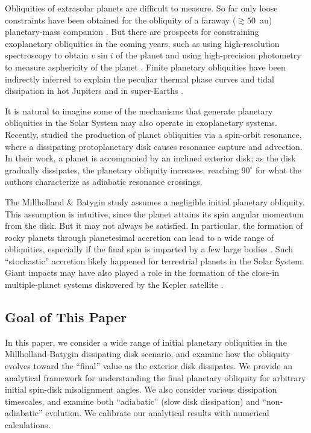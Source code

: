 \documentclass[twocolumn,twocolappendix]{aastex63}
\begin{document}
Obliquities of extrasolar planets are difficult to measure. So far only loose
constraints have been obtained for the obliquity of a faraway ($\gtrsim 50$~au)
planetary-mass companion \citep{bryan2020obliquity}. But there are prospects for
constraining exoplanetary obliquities in the coming years, such as using
high-resolution spectroscopy to obtain $v\sin i$ of the planet
\citep{snellen2014fast, bryan2018constraints} and using high-precision
photometry to measure asphericity of the planet \citep{seager2002constraining}.
Finite planetary obliquities have been indirectly inferred to explain the
peculiar thermal phase curves \citep[see e.g.][]{millholland_signatures,
ohno_infer_obl} and tidal dissipation in hot Jupiters
\citep{millholland_wasp12b} and in super-Earths
\citep{millholland2019obliquity}.

It is natural to imagine some of the mechanisms that generate planetary
obliquities in the Solar System may also operate in exoplanetary systems.
Recently, \citet{millholland_disk} studied the production of planet obliquities
via a spin-orbit resonance, where a dissipating protoplanetary disk causes
resonance capture and advection. In their work, a planet is accompanied by an
inclined exterior disk; as the disk gradually dissipates, the planetary
obliquity increases, reaching $90^\circ$ for what the authors characterize as
adiabatic resonance crossings.

The Millholland \& Batygin study assumes a negligible initial planetary
obliquity. This assumption is intuitive, since the planet attains its spin
angular momentum from the disk. But it may not always be satisfied. In
particular, the formation of rocky planets through planetesimal accretion can
lead to a wide range of obliquities, especially if the final spin is imparted by
a few large bodies \citep{dones1993does, lissauer1997accretion,
miguel2010planet}. Such ``stochastic'' accretion likely happened for terrestrial
planets in the Solar System. Giant impacts may have also played a role in the
formation of the close-in multiple-planet systems diskovered by the Kepler
satellite \citep[e.g.][]{inamdar2015formation, izidoro2017breaking}.

\subsection{Goal of This Paper}

In this paper, we consider a wide range of initial planetary obliquities in the
Millholland-Batygin dissipating disk scenario, and examine how the obliquity
evolves toward the ``final'' value as the exterior disk dissipates. We provide
an analytical framework for understanding the final planetary obliquity for
arbitrary initial spin-disk misalignment angles. We also consider various
dissipation timescales, and examine both ``adiabatic'' (slow disk dissipation)
and ``non-adiabatic'' evolution. We calibrate our analytical results with
numerical calculations.
\end{document}
